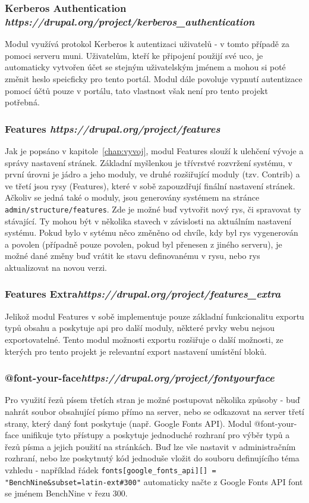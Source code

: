 \subsubsection*{\textbf{Kerberos Authentication} \hfill \emph{https://drupal.org/project/kerberos\_authentication}} 
Modul využívá protokol Kerberos k autentizaci uživatelů - v tomto případě za pomoci serveru \gls{muni}. Uživatelům, kteří ke připojení použijí své \gls{uco}, je automaticky vytvořen účet se stejným uživatelským jménem a mohou si poté změnit heslo speicficky pro tento portál. Modul dále povoluje vypnutí autentizace pomocí účtů pouze v portálu, tato vlastnost však není pro tento projekt potřebná.

\subsubsection*{\textbf{Features} \hfill \emph{https://drupal.org/project/features}} 
\label{subsec:features}
Jak je popsáno v kapitole~\ref{chap:vyvoj}, modul Features slouží k ulehčení vývoje a správy nastavení stránek. Základní myšlenkou je třívrstvé rozvržení systému, v první úrovni je jádro a jeho moduly, ve druhé rozšiřující moduly (tzv. Contrib) a ve třetí jsou rysy (Features), které v sobě zapouzdřují finální nastavení stránek. Ačkoliv se jedná také o moduly, jsou generovány systémem na stránce \texttt{admin/structure/features}. Zde je možné buď vytvořit nový rys, či spravovat ty stávající. Ty mohou být v několika stavech v závislosti na aktuálním nastavení systému. Pokud bylo v sytému něco změněno od chvíle, kdy byl rys vygenerován a povolen (případně pouze povolen, pokud byl přenesen z jiného serveru), je možné dané změny buď vrátit ke stavu definovanému v rysu, nebo rys aktualizovat na novou verzi.

\subsubsection*{\textbf{Features Extra}\hfill \emph{https://drupal.org/project/features\_extra}} 
Jelikož modul Features v sobě implementuje pouze základní funkcionalitu exportu typů obsahu a poskytuje \gls{api} pro další moduly, některé prvky webu nejsou exportovatelné. Tento modul možnosti exportu rozšiřuje o další možnosti, ze kterých pro tento projekt je relevantní export nastavení umístění bloků.

\subsubsection*{\textbf{@font-your-face}\hfill \emph{https://drupal.org/project/fontyourface}} 
Pro využití řezů písem třetích stran je možné postupovat několika způsoby - buď nahrát soubor obsahující písmo přímo na server, nebo se odkazovat na server třetí strany, který daný font poskytuje (např. Google Fonts API). Modul @font-your-face unifikuje tyto přístupy a poskytuje jednoduché rozhraní pro výběr typů a řezů písma a jejich použití na stránkách. Buď lze vše nastavit v administračním rozhraní, nebo lze poskytnutý kód jednoduše vložit do souboru definujícího téma vzhledu - například řádek \texttt{fonts[google\_fonts\_api][] = "BenchNine\&subset=latin-ext\#300"} automaticky načte z Google Fonts API font se jménem BenchNine v řezu 300.


